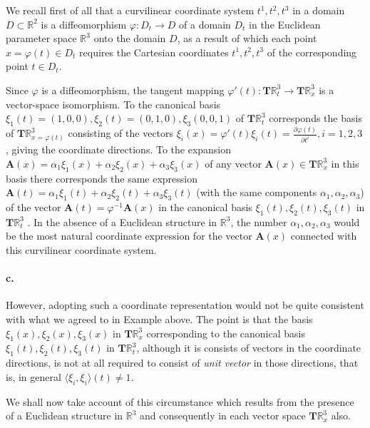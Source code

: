 \documentclass[a4paper,12pt]{article}
\begin{document}
\begin{CJK}{UTF8}{gbsn}
We recall first of all that a curvilinear coordinate system $t^1, t^2, 
t^3$ in a domain $D \subset \mathbb{R}^2$ is a diffeomorphism $\varphi : 
D_t \to D$ of a domain $D_t$ in the Euclidean parameter space $\mathbb{R}^3$
onto the domain $D$, as a result of which each point $x = \varphi(t) \in D_t$
requires the Cartesian coordinates $t^1, t^2, t^3$ of the corresponding 
point $t \in D_t$.

Since $\varphi$ is a diffeomorphism, the tangent mapping $\varphi'(t): \bm{T}\mathbb{R}_t^3 
\to \bm{T}\mathbb{R}_x^3$ is a vector-space isomorphism. To the canonical basis 
$\xi_1(t) = \left(1, 0, 0\right), \xi_2(t) = \left(0, 1, 0\right), \xi_3\left(0, 0, 1\right)$
of $\bm{T}\mathbb{R}_t^3$ corresponds the basis of $\bm{T}\mathbb{R}_{x=\varphi(t)}^3$
consisting of the vectors $\xi_i(x) = \varphi'(t)\xi_i(t) = \frac{\partial \varphi(t)}{\partial t^i},
i=1,2,3$, giving the coordinate directions. To the expansion $\bm{A}(x)
= \alpha_1\xi_1(x) + \alpha_2\xi_2(x) + \alpha_3\xi_3(x)$ of any vector $\bm{A}(x) \in 
\bm{T}\mathbb{R}_x^3$ in this basis there corresponds the same expression 
$\bm{A}(t) = \alpha_1\xi_1(t) + \alpha_2\xi_2(t) + \alpha_3\xi_3(t)$ (with the same components 
$\alpha_1, \alpha_2, \alpha_3$) of the vector $\bm{A}(t) = \varphi^{-1}\bm{A}(x)$ in the 
canonical basis $\xi_1(t), \xi_2(t), \xi_3(t)$ in $\bm{T}\mathbb{R}_t^3$ .
In the absence of a Euclidean structure in $\mathbb{R}^3$, the number 
$\alpha_1, \alpha_2, \alpha_3$ would be the most natural coordinate expression 
for the vector $\bm{A}(x)$ connected with this curvilinear coordinate system.

\paragraph{\textbf{c.}} However, adopting such a coordinate representation 
would not be quite consistent with what we agreed to in Example above. 
The point is that the basis $\xi_1(x), \xi_2(x), \xi_3(x)$ in $\bm{T}\mathbb{R}_x^3$
corresponding to the canonical basis $\xi_1(t), \xi_2(t), \xi_3(t)$ in $\bm{T}\mathbb{R}_t^3$,
although it is consists of vectors in the coordinate directions, is not 
at all required to consist of \textit{unit vector} in those directions, that is,
in general $\langle \xi_i, \xi_i\rangle (t) \ne 1.$

We shall now take account of this circumstance which results from the 
presence of a Euclidean structure in $\mathbb{R}^3$ and consequently in 
each vector space $\bm{T}\mathbb{R}_x^3$ also.


\end{CJK}
\end{document}
